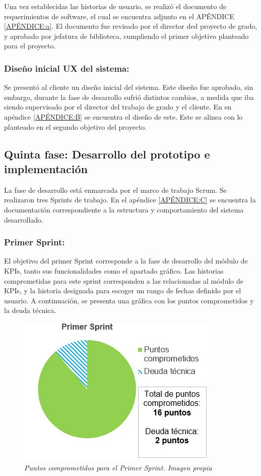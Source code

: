 \documentclass[spanish]{ieee_upb}
\begin{document}
Una vez establecidas las historias de usuario, se realizó el documento de requerimientos de software, el cual se encuentra adjunto en el APÉNDICE \ref{APÉNDICE:a}. El documento fue revisado por el director ded proyecto de grado, y aprobado por jefatura de biblioteca, cumpliendo el primer objetivo planteado para el proyecto. 

\subsubsection{Diseño inicial UX del sistema: }
Se presentó al cliente un diseño inicial del sistema. Este diseño fue aprobado, sin embargo, durante la fase de desarrollo sufrió distintos cambios, a medida que iba siendo supervisado por el director del trabajo de grado y el cliente. En en apéndice \ref{APÉNDICE:B} se encuentra el diseño de este. Este se alinea con lo planteado en el segundo objetivo del proyecto. 

\subsection{Quinta fase: Desarrollo del prototipo e implementación}

La fase de desarrollo está enmarcada por el marco de trabajo Scrum. Se realizaron tres Sprints de trabajo. 
En el apéndice \ref{APÉNDICE:C} se encuentra la documentación correspondiente a la estructura y comportamiento del sistema desarrollado.

 
 \subsubsection[Primer Sprint]{Primer Sprint: }
 El objetivo del primer Sprint corresponde a la fase de desarrollo del módulo de KPIs, tanto sus funcionalidades como el apartado gráfico. Las historias comprometidas
 para este sprint corresponden a las relacionadas al módulo de KPIs, y la historia designada para escoger un rango de fechas definido por el usuario.
 A continuación, se presenta una gráfica con los puntos comprometidos y la deuda técnica. 

\begin{figure}[htpb] 
	\centering
	\includegraphics[width=0.4\linewidth]{img/Sprints/S1.png}
	\vspace{-1mm}
	\caption[Puntos comprometidos primer Sprint]{\textit{Puntos comprometidos para el Primer Sprint. Imagen propia}}
	\label{fig:S1} 
\end{figure}
\end{document}
